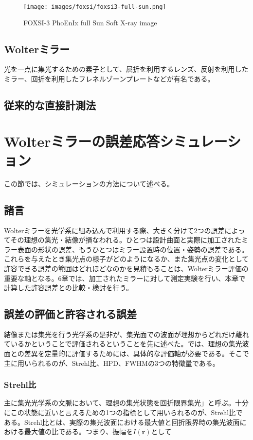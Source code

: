 \documentclass[dvipdfmx,autodetect-engine]{jreport}
\begin{document}
\begin{figure}[h!]
\centering
\texttt{[image: images/foxsi/foxsi3-full-sun.png]}
\caption{FOXSI-3 PhoEnIx full Sun Soft X-ray image}
\label{fig:foxsi-fullsun-image}
\end{figure}

\section{Wolterミラー}
光を一点に集光するための素子として、屈折を利用するレンズ、反射を利用したミラー、回折を利用したフレネルゾーンプレートなどが有名である。


\section{従来的な直接計測法}

\newpage
\chapter{Wolterミラーの誤差応答シミュレーション}

この節では、シミュレーションの方法について述べる。


\newpage
\section{諸言}
Wolterミラーを光学系に組み込んで利用する際、大きく分けて2つの誤差によってその理想の集光・結像が損なわれる。ひとつは設計曲面と実際に加工されたミラー表面の形状の誤差、もうひとつはミラー設置時の位置・姿勢の誤差である。
これらを与えたとき集光点の様子がどのようになるか、また集光点の変化として許容できる誤差の範囲はどれほどなのかを見積もることは、Wolterミラー評価の重要な軸となる。6章では、加工されたミラーに対して測定実験を行い、本章で計算した許容誤差との比較・検討を行う。

\section{誤差の評価と許容される誤差}
結像または集光を行う光学系の是非が、集光面での波面が理想からどれだけ離れているかということで評価されるということを先に述べた。では、理想の集光波面との差異を定量的に評価するためには、具体的な評価軸が必要である。そこで主に用いられるのが、Strehl比、HPD、FWHMの3つの特徴量である。

\subsection{Strehl比}
主に集光光学系の文脈において、理想の集光状態を回折限界集光」と呼ぶ。十分にこの状態に近いと言えるための1つの指標として用いられるのが、Strehl比である。Strehl比とは、実際の集光波面における最大値と回折限界時の集光波面における最大値の比である。つまり、振幅を$I(\mathbf{r})$として
\end{document}
